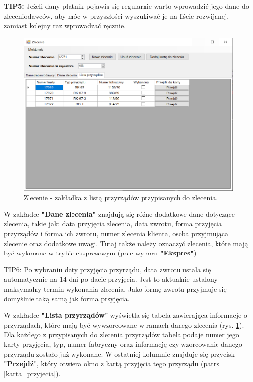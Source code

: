 \textbf{TIP5:} Jeżeli dany płatnik pojawia się regularnie warto wprowadzić jego dane do zleceniodawców, aby móc w przyszłości wyszukiwać je na liście rozwijanej, zamiast kolejny raz wprowadzać ręcznie.

\begin{figure}[htb]
	\centering
	\includegraphics[width=\columnwidth]{obrazki/Biuro/zlecenie/zlecenie_lista.png}
	\caption{Zlecenie - zakładka z listą przyrządów przypisanych do zlecenia.}
	\label{zlecenieLista}
\end{figure}

W zakładce \textbf{"Dane zlecenia"} znajdują się różne dodatkowe dane dotyczące zlecenia, takie jak: data przyjęcia zlecenia, data zwrotu, forma przyjęcia przyrządów i forma ich zwrotu, numer zlecenia klienta, osoba przyjmująca zlecenie oraz dodatkowe uwagi. Tutaj także należy oznaczyć zlecenia, które mają być wykonane w trybie ekspresowym (pole wyboru \textbf{"Ekspres"}). 

TIP6: Po wybraniu daty przyjęcia przyrządu, data zwrotu ustala się automatycznie na 14 dni po dacie przyjęcia. Jest to aktualnie ustalony maksymalny termin wykonania zlecenia. Jako formę zwrotu przyjmuje się domyślnie taką samą jak forma przyjęcia.

W zakładce \textbf{"Lista przyrządów"} wyświetla się tabela zawierająca informacje o przyrządach, które mają być wywzorcowane w ramach danego zlecenia (rys. \ref{zlecenieLista}). Dla każdego z przypisanych do zlecenia przyrządów tabela podaje numer jego karty przyjęcia, typ, numer fabryczny oraz informację czy wzorcowanie danego przyrządu zostało już wykonane. W ostatniej kolumnie znajduje się przycisk \textbf{"Przejdź"}, który otwiera okno z kartą przyjęcia tego przyrządu (patrz \ref{karta_przyjecia}).

